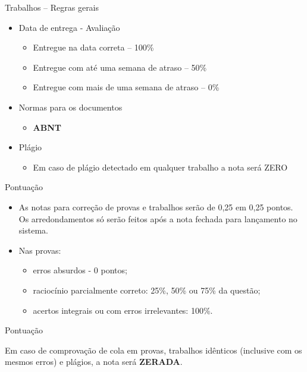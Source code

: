 \documentclass[aspectratio=169,
				xcolor=table]{beamer}
\begin{document}
	\begin{frame}{Trabalhos – Regras gerais}
		\begin{itemize}
			\item Data de entrega - Avaliação
			\begin{itemize}
				\item Entregue na data correta – 100\%
				\item Entregue com até uma semana de atraso – 50\%
				\item Entregue com mais de uma semana de atraso – 0\%
			\end{itemize}
			\item Normas para os documentos
			\begin{itemize}
				\item \textbf{ABNT}
			\end{itemize}
			\item Plágio
			\begin{itemize}
				\item Em caso de plágio detectado em qualquer trabalho a nota será ZERO
			\end{itemize}
		\end{itemize}
	\end{frame}
	
	\begin{frame}{Pontuação}
		\begin{itemize}
			\item As notas para correção de provas e trabalhos serão de 0,25 em 0,25 pontos. Os arredondamentos só serão feitos após a nota fechada para lançamento no sistema. 

			\item Nas provas: 
			\begin{itemize}
				\item erros absurdos - 0 pontos; 
				\item raciocínio parcialmente correto: 25\%, 50\% ou 75\% da questão; 
				\item acertos integrais ou com erros irrelevantes: 100\%.

			\end{itemize}

		\end{itemize}
	\end{frame}
	
	\begin{frame}{Pontuação}
		\begin{center}
			\Huge \alert {Em caso de comprovação de cola em provas, trabalhos idênticos (inclusive com os mesmos erros) e plágios, a nota será \textbf{ZERADA}.}		
		\end{center}
	\end{frame}
	
\end{document}
